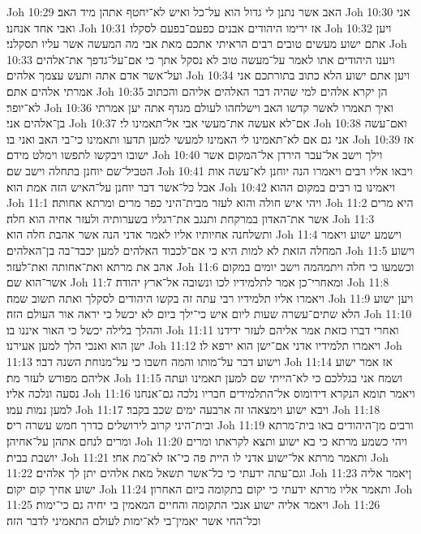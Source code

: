 Joh 10:29  האב אשר נתנן לי גדול הוא על־כל ואיש לא־יחטף אתהן מיד האב׃
Joh 10:30  אני ואבי אחד אנחנו׃
Joh 10:31  אז ירימו היהודים אבנים כפעם־בפעם לסקלו׃
Joh 10:32  ויען אתם ישוע מעשים טובים רבים הראיתי אתכם מאת אבי מה המעשה אשר עליו תסקלני׃
Joh 10:33  ויענו היהודים אתו לאמר על־מעשה טוב לא נסקל אתך כי אם־על־גדפך את־אלהים ועל־אשר אדם אתה ותעש עצמך אלהים׃
Joh 10:34  ויען אתם ישוע הלא כתוב בתורתכם אני אמרתי אלהים אתם׃
Joh 10:35  הן יקרא אלהים למי שהיה דבר האלהים אליהם והכתוב לא־יופר׃
Joh 10:36  ואיך תאמרו לאשר קדשו האב וישלחהו לעולם מגדף אתה יען אמרתי בן־אלהים אני׃
Joh 10:37  אם־לא אעשה את־מעשי אבי אל־תאמינו לי׃
Joh 10:38  ואם־עשה אני גם אם לא־תאמינו לי האמינו למעשי למען תדעו ותאמינו כי־בי האב ואני בו׃
Joh 10:39  אז ישובו ויבקשו לתפשו וימלט מידם׃
Joh 10:40  וילך וישב אל־עבר הירדן אל־המקום אשר הטביל־שם יוחנן בתחלה וישב שם׃
Joh 10:41  ויבאו אליו רבים ויאמרו הנה יוחנן לא־עשה אות אבל כל־אשר דבר יוחנן על־האיש הזה אמת הוא׃
Joh 10:42  ויאמינו בו רבים במקום ההוא׃
Joh 11:1  ויהי איש חולה והוא לעזר מבית־היני כפר מרים ומרתא אחותה׃
Joh 11:2  היא מרים אשר את־האדון במרקחת ותנגב את־רגליו בשערותיה ולעזר אחיה הוא חלה׃
Joh 11:3  ותשלחנה אחיותיו אליו לאמר אדני הנה אשר אהבת חלה הוא׃
Joh 11:4  וישמע ישוע ויאמר המחלה הזאת לא למות היא כי אם־לכבוד האלהים למען יכבד־בה בן־האלהים׃
Joh 11:5  וישוע אהב את מרתא ואת־אחותה ואת־לעזר׃
Joh 11:6  וכשמעו כי חלה ויתמהמה וישב יומים במקום אשר־הוא שם׃
Joh 11:7  ומאחרי־כן אמר לתלמידיו לכו ונשובה אל־ארץ יהודה׃
Joh 11:8  ויאמרו אליו תלמידיו רבי עתה זה בקשו היהודים לסקלך ואתה תשוב שמה׃
Joh 11:9  ויען ישוע הלא שתים־עשרה שעות ליום איש כי־ילך ביום לא יכשל כי יראה אור העולם הזה׃
Joh 11:10  וההלך בלילה יכשל כי האור איננו בו׃
Joh 11:11  ואחרי דברו כזאת אמר אליהם לעזר ידידנו ישן הוא ואנכי הלך למען אעירנו׃
Joh 11:12  ויאמרו תלמידיו אדני אם־ישן הוא ירפא לו׃
Joh 11:13  וישוע דבר על־מותו והמה חשבו כי על־מנוחת השנה דבר׃
Joh 11:14  אז אמר ישוע אליהם מפורש לעזר מת׃
Joh 11:15  ושמח אני בגללכם כי לא־הייתי שם למען תאמינו ועתה נסעה ונלכה אליו׃
Joh 11:16  ויאמר תומא הנקרא דידומוס אל־התלמידים חבריו נלכה גם־אנחנו למען נמות עמו׃
Joh 11:17  ויבא ישוע וימצאהו זה ארבעה ימים שכב בקבר׃
Joh 11:18  ובית־היני קרוב לירושלים כדרך חמש עשרה ריס׃
Joh 11:19  ורבים מן־היהודים באו בית־מרתא ומרים לנחם אתהן על־אחיהן׃
Joh 11:20  ויהי כשמע מרתא כי בא ישוע ותצא לקראתו ומרים יושבת בבית׃
Joh 11:21  ותאמר מרתא אל־ישוע אדני לו היית פה כי־אז לא־מת אחי׃
Joh 11:22  וגם־עתה ידעתי כי כל־אשר תשאל מאת אלהים יתן לך אלהים׃
Joh 11:23  ןיאמר אליה ישוע אחיך קום יקום׃
Joh 11:24  ותאמר אליו מרתא ידעתי כי יקום בתקומה ביום האחרון׃
Joh 11:25  ויאמר אליה ישוע אנכי התקומה והחיים המאמין בי יחיה גם כי־ימות׃
Joh 11:26  וכל־החי אשר יאמין־בי לא־ימות לעולם התאמיני לדבר הזה׃
